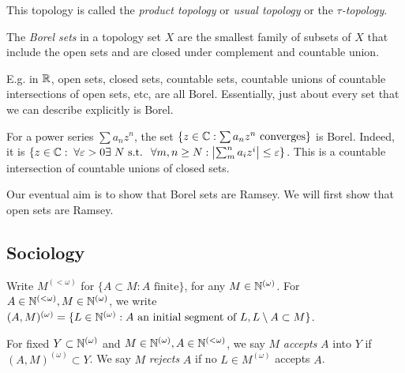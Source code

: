 \documentclass[10pt,a4paper]{article}
\begin{document}
This topology is called the \emph{product topology} or \emph{usual topology} or the \emph{$\tau$-topology}.

The \emph{Borel sets} in a topology set $X$ are the smallest family of subsets of $X$ that include the open sets and are closed under complement and countable union.

E.g. in $\mathbb{R}$, open sets, closed sets, countable sets, countable unions of countable intersections of open sets, etc, are all Borel. Essentially, just about every set that we can describe explicitly is Borel.

For a power series $\sum a_n z^n$, the set $\{z \in \mathbb{C}: \sum a_n z^n \text{ converges}\}$ is Borel. Indeed, it is $\{z \in \C: \forall \epsilon >0 \exists N \st \forall m,n \geq N:\left|\sum_{m}^{n}a_i z^i \right| \leq \epsilon\}$. This is a countable intersection of countable unions of closed sets.

Our eventual aim is to show that Borel sets are Ramsey. We will first show that open sets are Ramsey.

\subsection{Sociology}
Write $M^{(<\omega)}$ for $\{A \subset M: A \text{ finite}\}$, for any $M \in \mathbb{N}^{(\omega)}$. For $A \in \mathbb{N}^{(<\omega)}, M\in \mathbb{N}^{(\omega)}$, we write $(A,M)^{(\omega)} = \{L \in \mathbb{N}^{(\omega)} : A \text{ an initial segment of }L, L\setminus A \subset M\}$.

For fixed $Y \subset \mathbb{N}^{(\omega)}$ and $M \in \mathbb{N}^{(\omega)}, A \in \mathbb{N}^{(<\omega)}$, we say $M$ \emph{accepts} $A$ into $Y$ if $(A, M)^{(\omega)} \subset Y$. We say $M$ \emph{rejects} $A$ if no $L \in M^{(\omega)}$ accepts $A$.
\end{document}
